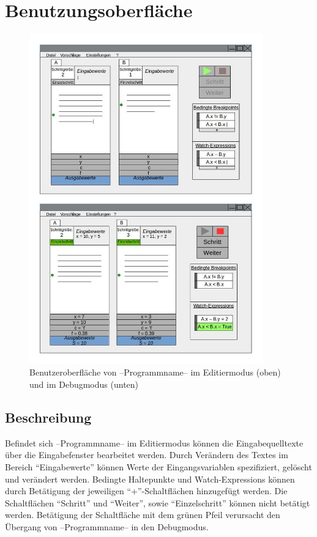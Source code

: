 \documentclass[parskip=full]{scrartcl}
\begin{document}
\newpage
\section{Benutzungsoberfläche}
\begin{figure}[!ht] 
    \vspace{-20pt}
    \centering
       \includegraphics[width=0.9\textwidth]{skizzeFull}
       \caption{
         Benutzeroberfläche von --Programmname-- im Editiermodus (oben) und im Debugmodus
         (unten)
       }
    \label{fig:Bild1}
\end{figure}

    \subsection{Beschreibung}
        Befindet sich --Programmname-- im Editiermodus können die Eingabequelltexte über die 
        Eingabefenster bearbeitet werden.
        Durch Verändern des Textes im Bereich \enquote{Eingabewerte} können Werte der Eingangsvariablen
        spezifiziert, gelöscht und verändert werden. 
        Bedingte Haltepunkte und Watch-Expressions können durch Betätigung der jeweiligen 
        \enquote{+}-Schaltflächen hinzugefügt werden.
        Die Schaltflächen \enquote{Schritt} und \enquote{Weiter}, sowie \enquote{Einzelschritt} können nicht betätigt
        werden. Betätigung der Schaltfläche mit dem grünen Pfeil verursacht den Übergang von
        --Programmname-- in den Debugmodus.
        
\end{document}

